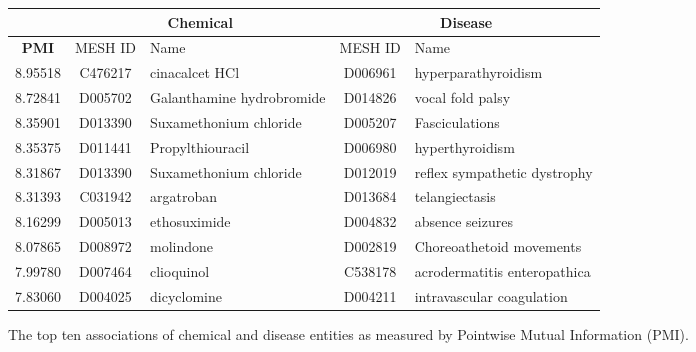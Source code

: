 \documentclass[10pt, oneside]{article}
\begin{document}
\begin{figure}[h]
\begin{center}
\fontsize{9}{11}\selectfont
\begin{tabular}{|*{2}{c|}p{4.5cm}|c|p{4.5cm}|}\hline
 & \multicolumn{2}{c|}{\textbf{Chemical}} & \multicolumn{2}{c|}{\textbf{Disease}} \\ \hline 
 \textbf{PMI} & MESH ID   & Name                      & MESH ID   & Name                         \\ \hline
 8.95518 & C476217   & cinacalcet HCl            & D006961   & hyperparathyroidism          \\ \hline
 8.72841 & D005702   & Galanthamine hydrobromide & D014826   & vocal fold palsy             \\ \hline
 8.35901 & D013390   & Suxamethonium chloride    & D005207   & Fasciculations               \\ \hline
 8.35375 & D011441   & Propylthiouracil          & D006980   & hyperthyroidism              \\ \hline
 8.31867 & D013390   & Suxamethonium chloride    & D012019   & reflex sympathetic dystrophy \\ \hline
 8.31393 & C031942   & argatroban                & D013684   & telangiectasis               \\ \hline
 8.16299 & D005013   & ethosuximide              & D004832   & absence seizures             \\ \hline
 8.07865 & D008972   & molindone                 & D002819   & Choreoathetoid movements     \\ \hline
 7.99780 & D007464   & clioquinol                & C538178   & acrodermatitis enteropathica \\ \hline
 7.83060 & D004025   & dicyclomine               & D004211   & intravascular coagulation    \\ \hline
\end{tabular}
\caption{\label{fig:pmi} The top ten associations of chemical and disease entities as measured by Pointwise Mutual Information (PMI).}
\end{center}
\end{figure}
\end{document}
